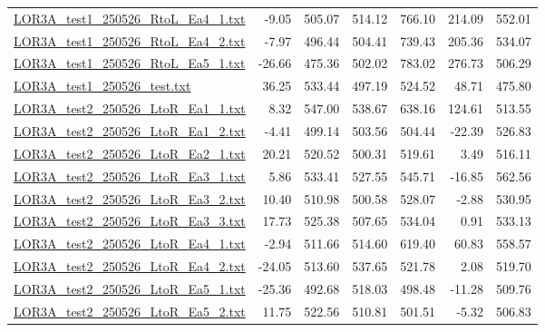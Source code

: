 \documentclass[platex,dvipdfmx,10pt,twoside,a4paper,jis2004]{jsarticle}
\begin{document}
\begin{table}[H]
{\begin{tabular}{lD{.}{.}{4.2}D{.}{.}{4.2}D{.}{.}{4.2}D{.}{.}{4.2}D{.}{.}{4.2}D{.}{.}{4.2}}
            \hyperref[fig:LOR3Atest1250526RtoLEa41]{LOR3A\_test1\_250526\_RtoL\_Ea4\_1.txt} & -9.05 & 505.07 & 514.12 & 766.10 & 214.09 & 552.01 \\
            \hyperref[fig:LOR3Atest1250526RtoLEa42]{LOR3A\_test1\_250526\_RtoL\_Ea4\_2.txt} & -7.97 & 496.44 & 504.41 & 739.43 & 205.36 & 534.07 \\
            \hyperref[fig:LOR3Atest1250526RtoLEa51]{LOR3A\_test1\_250526\_RtoL\_Ea5\_1.txt} & -26.66 & 475.36 & 502.02 & 783.02 & 276.73 & 506.29 \\
            \hyperref[fig:LOR3Atest1250526test]{LOR3A\_test1\_250526\_test.txt} & 36.25 & 533.44 & 497.19 & 524.52 & 48.71 & 475.80 \\
            \hyperref[fig:LOR3Atest2250526LtoREa11]{LOR3A\_test2\_250526\_LtoR\_Ea1\_1.txt} & 8.32 & 547.00 & 538.67 & 638.16 & 124.61 & 513.55 \\
            \hyperref[fig:LOR3Atest2250526LtoREa12]{LOR3A\_test2\_250526\_LtoR\_Ea1\_2.txt} & -4.41 & 499.14 & 503.56 & 504.44 & -22.39 & 526.83 \\
            \hyperref[fig:LOR3Atest2250526LtoREa21]{LOR3A\_test2\_250526\_LtoR\_Ea2\_1.txt} & 20.21 & 520.52 & 500.31 & 519.61 & 3.49 & 516.11 \\
            \hyperref[fig:LOR3Atest2250526LtoREa31]{LOR3A\_test2\_250526\_LtoR\_Ea3\_1.txt} & 5.86 & 533.41 & 527.55 & 545.71 & -16.85 & 562.56 \\
            \hyperref[fig:LOR3Atest2250526LtoREa32]{LOR3A\_test2\_250526\_LtoR\_Ea3\_2.txt} & 10.40 & 510.98 & 500.58 & 528.07 & -2.88 & 530.95 \\
            \hyperref[fig:LOR3Atest2250526LtoREa33]{LOR3A\_test2\_250526\_LtoR\_Ea3\_3.txt} & 17.73 & 525.38 & 507.65 & 534.04 & 0.91 & 533.13 \\
            \hyperref[fig:LOR3Atest2250526LtoREa41]{LOR3A\_test2\_250526\_LtoR\_Ea4\_1.txt} & -2.94 & 511.66 & 514.60 & 619.40 & 60.83 & 558.57 \\
            \hyperref[fig:LOR3Atest2250526LtoREa42]{LOR3A\_test2\_250526\_LtoR\_Ea4\_2.txt} & -24.05 & 513.60 & 537.65 & 521.78 & 2.08 & 519.70 \\
            \hyperref[fig:LOR3Atest2250526LtoREa51]{LOR3A\_test2\_250526\_LtoR\_Ea5\_1.txt} & -25.36 & 492.68 & 518.03 & 498.48 & -11.28 & 509.76 \\
            \hyperref[fig:LOR3Atest2250526LtoREa52]{LOR3A\_test2\_250526\_LtoR\_Ea5\_2.txt} & 11.75 & 522.56 & 510.81 & 501.51 & -5.32 & 506.83 \\

\end{tabular}}
\end{table}
\end{document}
